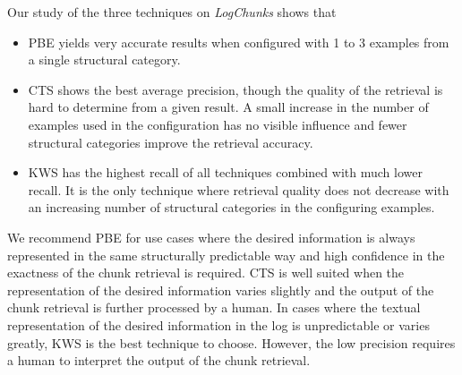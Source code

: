 \documentclass[\myrootdir/main.tex]{subfiles}
\begin{document}
Our study of the three techniques on \emph{LogChunks} shows that
\begin{itemize}
  \item PBE yields very accurate results when configured with 1 to 3 examples from a single structural category.
  \item CTS shows the best average precision, though the quality of the retrieval is hard to determine from a given result.
  A small increase in the number of examples used in the configuration has no visible influence and fewer structural categories improve the retrieval accuracy.
  \item KWS has the highest recall of all techniques combined with much lower recall.
  It is the only technique where retrieval quality does not decrease with an increasing number of structural categories in the configuring examples.
\end{itemize}
We recommend PBE for use cases where the desired information is always represented in the same structurally predictable way and high confidence in the exactness of the chunk retrieval is required.
CTS is well suited when the representation of the desired information varies slightly and the output of the chunk retrieval is further processed by a human.
In cases where the textual representation of the desired information in the log is unpredictable or varies greatly, KWS is the best technique to choose.
However, the low precision requires a human to interpret the output of the chunk retrieval.
\end{document}
